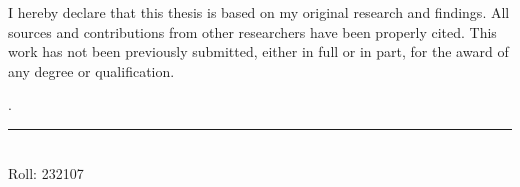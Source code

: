 I hereby declare that this thesis is based on my original research and findings. All sources and contributions from other researchers have been properly cited. This work has not been previously submitted, either in full or in part, for the award of any degree or qualification. 

 .

\vspace{1in}


\noindent   \rule{3.5cm}{1pt} \\
 Roll: 232107 \\

